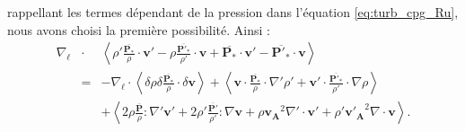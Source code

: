  rappellant les termes dépendant de la pression dans l'équation \eqref{eq:turb_cpg_Ru}, nous avons choisi la première possibilité. Ainsi : 
\begin{eqnarray*}
\nabla_{\boldsymbol{\ell}} &\cdot& \left< \rho' \frac{ \overline{\boldsymbol{P_*}}}{\rho} \cdot \boldsymbol{v'} -  \rho \frac{\overline{\boldsymbol{P'_*}}}{\rho'} \cdot \boldsymbol{v}  +  \overline{\boldsymbol{P_*}} \cdot \boldsymbol{v'} -  \overline{\boldsymbol{P'_*}} \cdot \boldsymbol{v} \right>\\
&=& -\nabla_{\boldsymbol{\ell}} \cdot \left<\delta \rho \delta \frac{ \overline{\boldsymbol{P_*}} }{\rho} \cdot \delta \boldsymbol{v} \right> +  \left<   \boldsymbol{v}\cdot\frac{ \overline{\boldsymbol{P_*}} }{\rho} \cdot  \nabla'\rho' + \boldsymbol{v'} \cdot \frac{ \overline{\boldsymbol{P'_*}} }{\rho'} \cdot \nabla \rho  \right> \\
&&+ \left< 2 \rho  \frac{ \overline{\boldsymbol{P}} }{\rho} : \nabla'\boldsymbol{v'} + 2  \rho'\frac{ \overline{\boldsymbol{P'}} }{\rho'} : \nabla \boldsymbol{v}  + \rho \boldsymbol{v_A}^2 \nabla' \cdot \boldsymbol{v'} +   \rho' \boldsymbol{v'_A}^2 \nabla \cdot \boldsymbol{v}\right> .
\end{eqnarray*}


